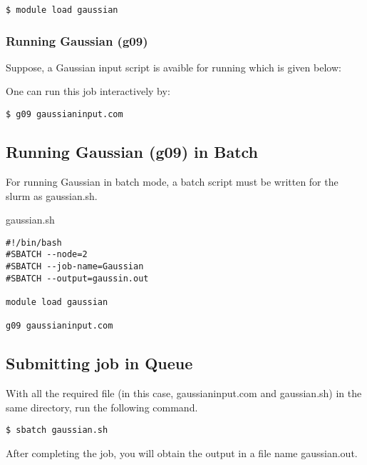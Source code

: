\documentclass[11pt]{article}
\numberwithin{figure}{section}
\begin{document}
\begin{lstlisting}[frame=single]
$ module load gaussian
\end{lstlisting}

\subsubsection{Running Gaussian (g09)}
Suppose, a Gaussian input script is avaible for running which is given below:

One can run this job interactively by:

\begin{lstlisting}[frame=single]
$ g09 gaussianinput.com
\end{lstlisting}

\subsection{Running Gaussian (g09) in Batch}
For running Gaussian in batch mode, a batch script must be written for the
slurm as gaussian.sh.

gaussian.sh
\begin{lstlisting}[frame=single]
#!/bin/bash
#SBATCH --node=2
#SBATCH --job-name=Gaussian
#SBATCH --output=gaussin.out

module load gaussian

g09 gaussianinput.com
\end{lstlisting}


\subsection{Submitting job in Queue}
With all the required file (in this case, gaussianinput.com and gaussian.sh) in
the same directory, run the following command.

\begin{lstlisting}[frame=single]
$ sbatch gaussian.sh
\end{lstlisting}

After completing the job, you will obtain the output in a file name
gaussian.out.
\end{document}
